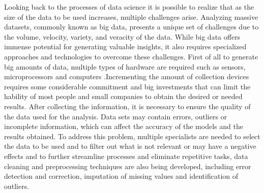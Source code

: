 \documentclass{vgtc}                          %
\begin{document}
Looking back to the processes of data science it is possible to realize that as the size of the data to be used increases, multiple challenges arise.
Analyzing massive datasets, commonly known as big data, presents a unique set of challenges due to the volume, velocity, variety, and veracity of 
the data. While big data offers immense potential for generating valuable insights, it also requires specialized approaches and technologies to 
overcome these challenges. First of all to generate big amounts of data, multiple types of hardware are required such as sensors, microprocessors and computers
.Incrementing the amount of collection devices requires some considerable commitment and big investments that can limit the hability of most people and small 
companies to obtain the desired or needed results. After collecting the information, it is necessary to ensure the quality of the data used for the analysis. Data 
sets may contain errors, outliers or incomplete information, which can affect the accuracy of the models and the results obtained. To address this problem, multiple 
specialists are needed to select the data to be used and to filter out what is not relevant or may have a negative effects and to further streamline processes and eliminate 
repetitive tasks, data cleaning and preprocessing techniques are also being developed, including error detection and correction, imputation of missing values and 
identification of outliers.\newline
\end{document}
